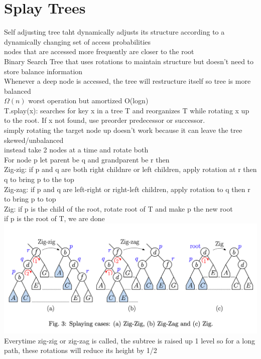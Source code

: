 \documentclass{article}
\begin{document}
  \section{Splay Trees}
  Self adjusting tree taht dynamically adjusts its structure according to a dynamically changing set of access probabilities\\
  \indent nodes that are accessed more frequently are closer to the root \\
  \indent Binary Search Tree that uses rotations to maintain structure but doesn't need to store balance information \\
  \indent Whenever a deep node is accessed, the tree will restructure itself so tree is more balanced \\
  \indent $\Omega(n)$ worst operation but amortized O(logn) \\
  T.splay(x): searches for key x in a tree T and reorganizes T while rotating x up to the root. If x not found, use preorder predecessor or successor. \\
  \indent simply rotating the target node up doesn't work because it can leave the tree skewed/unbalanced\\
  \indent instead take 2 nodes at a time and rotate both \\
  For node p let parent be q and grandparent be r then \\
  \indent Zig-zig: if p and q are both right childnre or left children, apply rotation at r then q to bring p to the top\\
  \indent Zig-zag: if p and q are left-right or right-left children, apply rotation to q then r to bring p to top \\
  \indent Zig: if p is the child of the root, rotate root of T and make p the new root\\
  \indent if p is the root of T, we are done\\
  \includegraphics[width=\textwidth]{SplayTreeZig}
  \indent Everytime zig-zig or zig-zag is called, the subtree is raised up 1 level so for a long path, these rotations will reduce its height by 1/2\\
\end{document}
